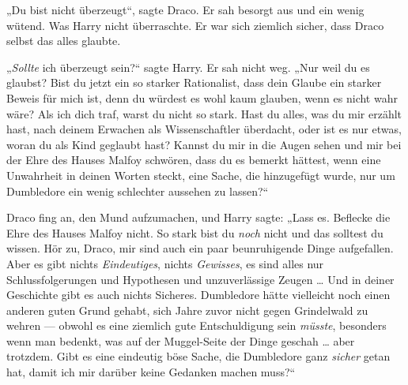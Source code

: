 „Du bist nicht überzeugt“, sagte Draco. Er sah besorgt aus und ein wenig wütend. Was Harry nicht überraschte. Er war sich ziemlich sicher, dass Draco selbst das alles glaubte.

„\emph{Sollte} ich überzeugt sein?“ sagte Harry. Er sah nicht weg.
„Nur weil du es glaubst? Bist du jetzt ein so starker Rationalist, dass dein Glaube ein starker Beweis für mich ist, denn du würdest es wohl kaum glauben, wenn es nicht wahr wäre? Als ich dich traf, warst du nicht so stark. Hast du alles, was du mir erzählt hast, nach deinem Erwachen als Wissenschaftler überdacht, oder ist es nur etwas, woran du als Kind geglaubt hast? Kannst du mir in die Augen sehen und mir bei der Ehre des Hauses Malfoy schwören, dass du es bemerkt hättest, wenn eine Unwahrheit in deinen Worten steckt, eine Sache, die hinzugefügt wurde, nur um Dumbledore ein wenig schlechter aussehen zu lassen?“

Draco fing an, den Mund aufzumachen, und Harry sagte:
„Lass es. Beflecke die Ehre des Hauses Malfoy nicht. So stark bist du \emph{noch} nicht und das solltest du wissen. Hör zu, Draco, mir sind auch ein paar beunruhigende Dinge aufgefallen. Aber es gibt nichts \emph{Eindeutiges}, nichts \emph{Gewisses}, es sind alles nur Schlussfolgerungen und Hypothesen und unzuverlässige Zeugen … Und in deiner Geschichte gibt es auch nichts Sicheres. Dumbledore hätte vielleicht noch einen anderen guten Grund gehabt, sich Jahre zuvor nicht gegen Grindelwald zu wehren — obwohl es eine ziemlich gute Entschuldigung sein \emph{müsste}, besonders wenn man bedenkt, was auf der Muggel-Seite der Dinge geschah … aber trotzdem. Gibt es eine eindeutig böse Sache, die Dumbledore ganz \emph{sicher} getan hat, damit ich mir darüber keine Gedanken machen muss?“

